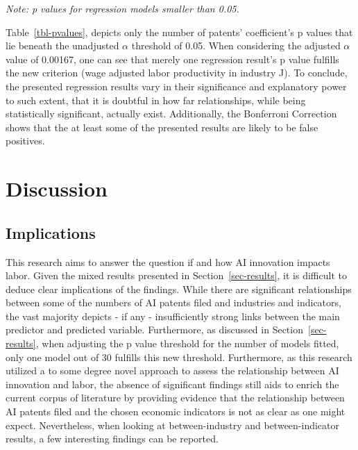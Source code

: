 \documentclass[
  12pt,
  a4paperpaper,
]{article}
\begin{document}
\vspace{-1.5em}\begin{flushleft}\hspace{3cm}\footnotesize\textit{Note: p values for regression models smaller than 0.05.}\end{flushleft}


Table~\ref{tbl-pvalues}, depicts only the number of patents'
coefficient's p values that lie beneath the unadjusted \(\alpha\)
threshold of 0.05. When considering the adjusted \(\alpha\) value of
0.00167, one can see that merely one regression result's p value
fulfills the new criterion (wage adjusted labor productivity in industry
J). To conclude, the presented regression results vary in their
significance and explanatory power to such extent, that it is doubtful
in how far relationships, while being statistically significant,
actually exist. Additionally, the Bonferroni Correction shows that the
at least some of the presented results are likely to be false positives.

\section{Discussion}\label{sec-discussion}

\subsection{Implications}\label{sec-implications}

This research aims to answer the question if and how AI innovation
impacts labor. Given the mixed results presented in
Section~\ref{sec-results}, it is difficult to deduce clear implications
of the findings. While there are significant relationships between some
of the numbers of AI patents filed and industries and indicators, the
vast majority depicts - if any - insufficiently strong links between the
main predictor and predicted variable. Furthermore, as discussed in
Section~\ref{sec-results}, when adjusting the p value threshold for the
number of models fitted, only one model out of 30 fulfills this new
threshold. Furthermore, as this research utilized a to some degree novel
approach to assess the relationship between AI innovation and labor, the
absence of significant findings still aids to enrich the current corpus
of literature by providing evidence that the relationship between AI
patents filed and the chosen economic indicators is not as clear as one
might expect. Nevertheless, when looking at between-industry and
between-indicator results, a few interesting findings can be reported.
\end{document}
